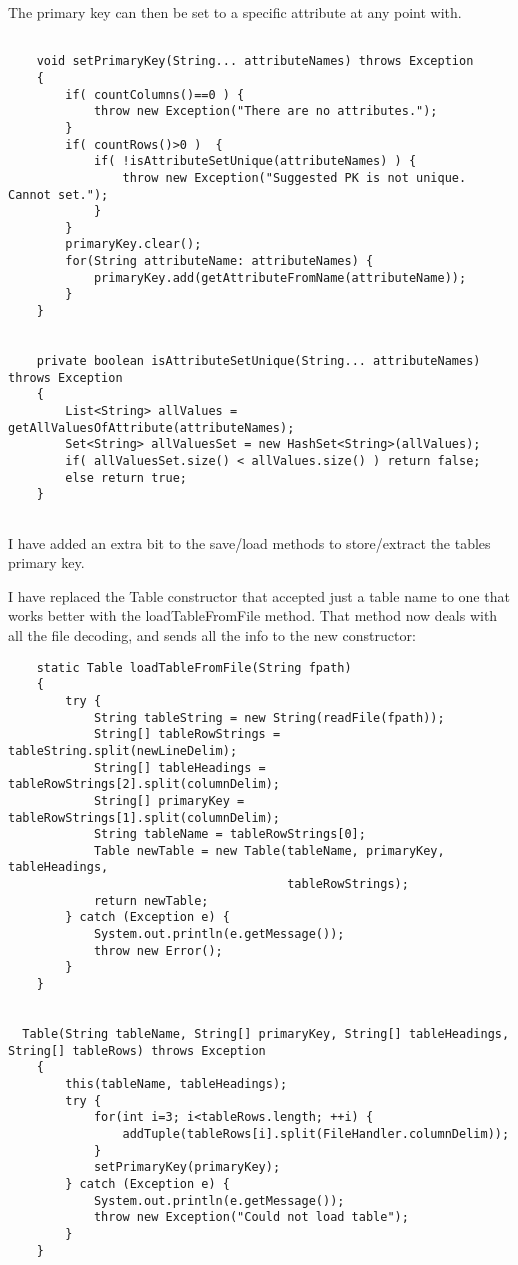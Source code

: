 \documentclass[11pt]{article} %
\begin{document}
The primary key can then be set to a specific attribute at any point with.
\begin{lstlisting}
    
    void setPrimaryKey(String... attributeNames) throws Exception
    {
        if( countColumns()==0 ) {
            throw new Exception("There are no attributes.");
        }
        if( countRows()>0 )  {
            if( !isAttributeSetUnique(attributeNames) ) {
                throw new Exception("Suggested PK is not unique. Cannot set.");
            }
        }
        primaryKey.clear();
        for(String attributeName: attributeNames) {
            primaryKey.add(getAttributeFromName(attributeName));
        }
    }
    
    
    private boolean isAttributeSetUnique(String... attributeNames) throws Exception
    {
        List<String> allValues = getAllValuesOfAttribute(attributeNames);
        Set<String> allValuesSet = new HashSet<String>(allValues);
        if( allValuesSet.size() < allValues.size() ) return false;
        else return true;
    }
    
\end{lstlisting}


I have added an extra bit to the save/load methods to store/extract the tables primary key.

I have replaced the Table constructor that accepted just a table name to one that works better with the loadTableFromFile method. 
That method now deals with all the file decoding, and sends all the info to the new constructor:

\begin{lstlisting}
    static Table loadTableFromFile(String fpath)
    {
        try {
            String tableString = new String(readFile(fpath));
            String[] tableRowStrings = tableString.split(newLineDelim);
            String[] tableHeadings = tableRowStrings[2].split(columnDelim);
            String[] primaryKey = tableRowStrings[1].split(columnDelim);
            String tableName = tableRowStrings[0];
            Table newTable = new Table(tableName, primaryKey, tableHeadings,
                                       tableRowStrings);
            return newTable;
        } catch (Exception e) {
            System.out.println(e.getMessage());
            throw new Error();
        }
    }


  Table(String tableName, String[] primaryKey, String[] tableHeadings, String[] tableRows) throws Exception
    {
        this(tableName, tableHeadings);
        try {
            for(int i=3; i<tableRows.length; ++i) {
                addTuple(tableRows[i].split(FileHandler.columnDelim));
            }
            setPrimaryKey(primaryKey);
        } catch (Exception e) {
            System.out.println(e.getMessage());
            throw new Exception("Could not load table");
        }
    }
\end{lstlisting}
\end{document}

